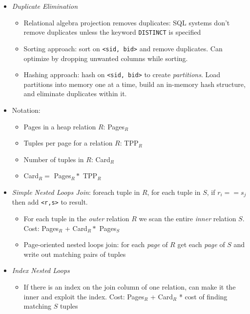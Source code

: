 \documentclass[landscape,8pt]{extarticle}
\newcommand{\code}{\lstinline}
\begin{document}
\begin{multicols}{4}
\begin{itemize}
\begin{itemize}
\begin{itemize}
            \end{itemize}
            \item \emph{Duplicate Elimination}
            \begin{itemize}
                \item Relational algebra projection removes duplicates: SQL systems don't remove duplicates unless the keyword \code{DISTINCT} is specified
                \item Sorting approach: sort on \code{<sid, bid>} and remove duplicates. Can optimize by dropping unwanted columns while sorting.
                \item Hashing approach: hash on \code{<sid, bid>} to create \emph{partitions}. Load partitions into memory one at a time, build an in-memory hash structure, and eliminate duplicates within it.
            \end{itemize}
            \item Notation:
            \begin{itemize}
                \item Pages in a heap relation $R$: Pages$_R$
                \item Tuples per page for a relation $R$: TPP$_R$
                \item Number of tuples in $R$: Card$_R$
                \item Card$_R = $ Pages$_R * $ TPP$_R$
            \end{itemize}
            \item \emph{Simple Nested Loops Join}: foreach tuple in $R$, for each tuple in $S$, if $r_i == s_j$ then add \code{<r,s>} to result.
            \begin{itemize}
                \item For each tuple in the \emph{outer} relation $R$ we scan the entire \emph{inner} relation $S$. Cost: Pages$_R$ + Card$_R * $ Pages$_S$
                \item Page-oriented nested loops join: for each \emph{page} of $R$ get each \emph{page} of $S$ and write out matching pairs of tuples
            \end{itemize}
            \item \emph{Index Nested Loops}
            \begin{itemize}
                \item If there is an index on the join column of one relation, can make it the inner and exploit the index. Cost: Pages$_R$ + Card$_R$ * cost of finding matching $S$ tuples

\end{itemize}
\end{itemize}
\end{itemize}
\end{multicols}
\end{document}
